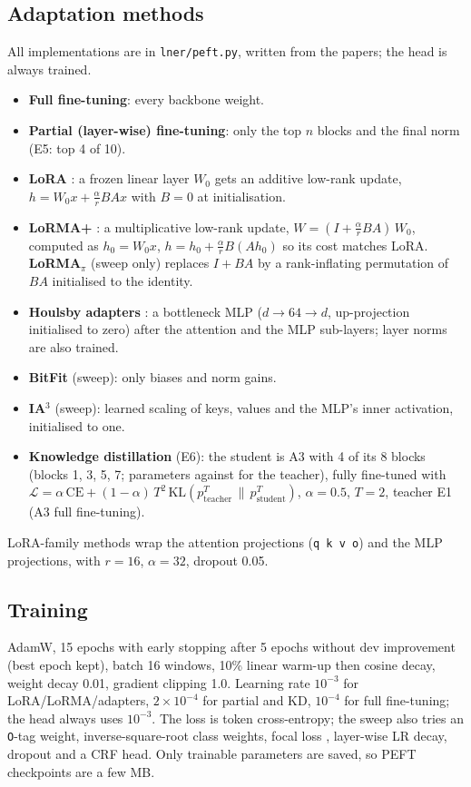 \documentclass[11pt,a4paper]{article}
\newcommand{\code}[1]{\texttt{\small #1}}
\begin{document}
\subsection{Adaptation methods}\label{sec:peft}
All implementations are in \code{lner/peft.py}, written from the papers; the head is always trained.
\begin{itemize}
  \item \textbf{Full fine-tuning}: every backbone weight.
  \item \textbf{Partial (layer-wise) fine-tuning}: only the top $n$ blocks and the final norm (E5: top 4 of 10).
  \item \textbf{LoRA} \cite{hu2022lora}: a frozen linear layer $W_0$ gets an additive low-rank update,
  $h = W_0x + \frac{\alpha}{r}BAx$ with $B=0$ at initialisation.
  \item \textbf{LoRMA+} \cite{bihany2025lorma}: a multiplicative low-rank update,
  $W = (I + \frac{\alpha}{r}BA)\,W_0$, computed as $h_0=W_0x$, $h = h_0 + \frac{\alpha}{r}B(Ah_0)$ so its cost
  matches LoRA.  \textbf{LoRMA$_\pi$} (sweep only) replaces $I + BA$ by a rank-inflating permutation of $BA$
  initialised to the identity.
  \item \textbf{Houlsby adapters} \cite{houlsby2019adapters}: a bottleneck MLP ($d\to64\to d$, up-projection
  initialised to zero) after the attention and the MLP sub-layers; layer norms are also trained.
  \item \textbf{BitFit} \cite{benzaken2022bitfit} (sweep): only biases and norm gains.
  \item \textbf{IA$^3$} \cite{liu2022ia3} (sweep): learned scaling of keys, values and the MLP's inner
  activation, initialised to one.
  \item \textbf{Knowledge distillation} \cite{hinton2015kd} (E6): the student is A3 with 4 of its 8 blocks
  (blocks 1, 3, 5, 7; \kdparams{} parameters against \teacherparams{} for the teacher), fully fine-tuned with
  $\mathcal{L} = \alpha\,\mathrm{CE} + (1-\alpha)\,T^2\,\mathrm{KL}(p_\text{teacher}^{T} \,\|\, p_\text{student}^{T})$,
  $\alpha=0.5$, $T=2$, teacher E1 (A3 full fine-tuning).
\end{itemize}
LoRA-family methods wrap the attention projections (\code{q k v o}) and the MLP projections, with $r=16$,
$\alpha=32$, dropout 0.05.

\subsection{Training}
AdamW, 15 epochs with early stopping after 5 epochs without dev improvement (best epoch kept), batch 16
windows, 10\% linear warm-up then cosine decay, weight decay 0.01, gradient clipping 1.0.  Learning rate
$10^{-3}$ for LoRA/LoRMA/adapters, $2\times10^{-4}$ for partial and KD, $10^{-4}$ for full fine-tuning; the
head always uses $10^{-3}$.  The loss is token cross-entropy; the sweep also tries an \code{O}-tag weight,
inverse-square-root class weights, focal loss \cite{lin2017focal}, layer-wise LR decay, dropout and a CRF head.
Only trainable parameters are saved, so PEFT checkpoints are a few MB.
\end{document}
